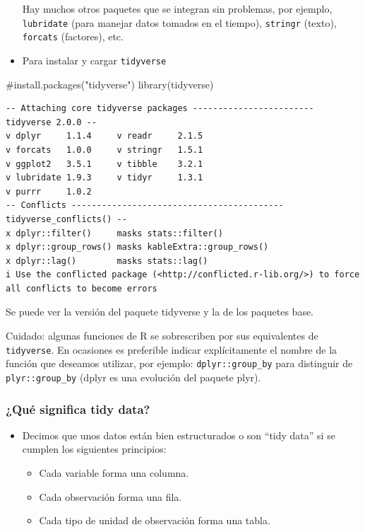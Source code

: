 \documentclass[
  letterpaper,
  DIV=11,
  numbers=noendperiod]{scrreprt}
\newenvironment{Shaded}{\begin{snugshade}}{\end{snugshade}}
\newcommand{\CommentTok}[1]{\textcolor[rgb]{0.37,0.37,0.37}{#1}}
\newcommand{\FunctionTok}[1]{\textcolor[rgb]{0.28,0.35,0.67}{#1}}
\newcommand{\NormalTok}[1]{\textcolor[rgb]{0.00,0.23,0.31}{#1}}
\begin{document}
\begin{itemize}
  Hay muchos otros paquetes que se integran sin problemas, por ejemplo,
  \texttt{lubridate} (para manejar datos tomados en el tiempo),
  \texttt{stringr} (texto), \texttt{forcats} (factores), etc.
\item
  Para instalar y cargar \texttt{tidyverse}
\end{itemize}

\begin{Shaded}
\begin{Highlighting}[]
\CommentTok{\#install.packages("tidyverse")}
\FunctionTok{library}\NormalTok{(tidyverse)}
\end{Highlighting}
\end{Shaded}

\begin{verbatim}
-- Attaching core tidyverse packages ------------------------ tidyverse 2.0.0 --
v dplyr     1.1.4     v readr     2.1.5
v forcats   1.0.0     v stringr   1.5.1
v ggplot2   3.5.1     v tibble    3.2.1
v lubridate 1.9.3     v tidyr     1.3.1
v purrr     1.0.2     
-- Conflicts ------------------------------------------ tidyverse_conflicts() --
x dplyr::filter()     masks stats::filter()
x dplyr::group_rows() masks kableExtra::group_rows()
x dplyr::lag()        masks stats::lag()
i Use the conflicted package (<http://conflicted.r-lib.org/>) to force all conflicts to become errors
\end{verbatim}

Se puede ver la versión del paquete tidyverse y la de los paquetes base.

{Cuidado}: algunas funciones de R se sobrescriben por sus equivalentes
de \texttt{tidyverse}. En ocasiones es preferible indicar explícitamente
el nombre de la función que deseamos utilizar, por ejemplo:
\texttt{dplyr::group\_by} para distinguir de \texttt{plyr::group\_by}
(dplyr es una evolución del paquete plyr).

\subsubsection{¿Qué significa tidy
data?}\label{quuxe9-significa-tidy-data}

\begin{itemize}
\item
  Decimos que unos datos están bien estructurados o son ``tidy data'' si
  se cumplen los siguientes principios:

  \begin{itemize}
  \item
    Cada variable forma una columna.
  \item
    Cada observación forma una fila.
  \item
    Cada tipo de unidad de observación forma una tabla.
  \end{itemize}
\end{itemize}
\end{document}
